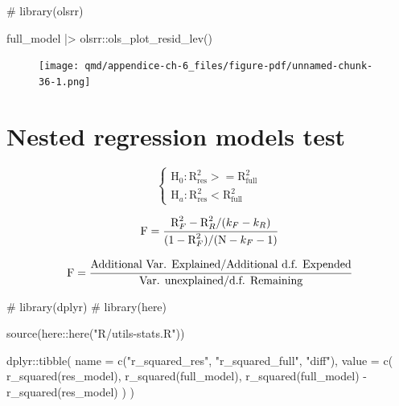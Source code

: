 \documentclass[
  12pt,
  a4paper,
  oneside]{tesesusp}
\newenvironment{Shaded}{\begin{snugshade}}{\end{snugshade}}
\newcommand{\AttributeTok}[1]{\textcolor[rgb]{0.40,0.45,0.13}{#1}}
\newcommand{\CommentTok}[1]{\textcolor[rgb]{0.37,0.37,0.37}{#1}}
\newcommand{\FunctionTok}[1]{\textcolor[rgb]{0.28,0.35,0.67}{#1}}
\newcommand{\NormalTok}[1]{\textcolor[rgb]{0.00,0.23,0.31}{#1}}
\newcommand{\SpecialCharTok}[1]{\textcolor[rgb]{0.37,0.37,0.37}{#1}}
\newcommand{\StringTok}[1]{\textcolor[rgb]{0.13,0.47,0.30}{#1}}
\begin{document}
\begin{Shaded}
\begin{Highlighting}[numbers=left,,]
\CommentTok{\# library(olsrr)}

\NormalTok{full\_model }\SpecialCharTok{|\textgreater{}}\NormalTok{ olsrr}\SpecialCharTok{::}\FunctionTok{ols\_plot\_resid\_lev}\NormalTok{()}
\end{Highlighting}
\end{Shaded}

\begin{figure}[H]

{\centering \texttt{[image: qmd/appendice-ch-6\_files/figure-pdf/unnamed-chunk-36-1.png]}

}

\end{figure}

\hypertarget{nested-regression-models-test}{%
\section{Nested regression models
test}\label{nested-regression-models-test}}

\[
\begin{cases}
\text{H}_{0}: \text{R}^{2}_{\text{res}} >= \text{R}^{2}_{\text{full}} \\
\text{H}_{a}: \text{R}^{2}_{\text{res}} < \text{R}^{2}_{\text{full}}
\end{cases}
\]

\[
\text{F} = \cfrac{\text{R}^{2}_{F} - \text{R}^{2}_{R} / (k_{F} - k_{R})}{(1 - \text{R}^{2}_{F}) / (\text{N} - k_{F} - 1)}
\]

\[
\text{F} = \cfrac{\text{Additional Var. Explained} / \text{Additional d.f. Expended}}{\text{Var. unexplained} / \text{d.f. Remaining}}
\]

\begin{Shaded}
\begin{Highlighting}[numbers=left,,]
\CommentTok{\# library(dplyr)}
\CommentTok{\# library(here)}

\FunctionTok{source}\NormalTok{(here}\SpecialCharTok{::}\FunctionTok{here}\NormalTok{(}\StringTok{"R/utils{-}stats.R"}\NormalTok{))}

\NormalTok{dplyr}\SpecialCharTok{::}\FunctionTok{tibble}\NormalTok{(}
  \AttributeTok{name =} \FunctionTok{c}\NormalTok{(}\StringTok{"r\_squared\_res"}\NormalTok{, }\StringTok{"r\_squared\_full"}\NormalTok{, }\StringTok{"diff"}\NormalTok{),}
  \AttributeTok{value =} \FunctionTok{c}\NormalTok{(}
  \FunctionTok{r\_squared}\NormalTok{(res\_model), }\FunctionTok{r\_squared}\NormalTok{(full\_model), }
  \FunctionTok{r\_squared}\NormalTok{(full\_model) }\SpecialCharTok{{-}} \FunctionTok{r\_squared}\NormalTok{(res\_model)}
\NormalTok{  )}
\NormalTok{)}
\end{Highlighting}
\end{Shaded}
\end{document}
